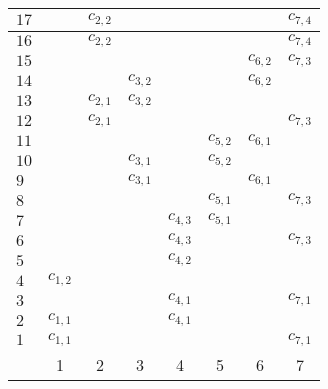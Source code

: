 \begin{center}
\begin{tabular}{l|c|c|c|c|c|c|c}
  \hline
  $17$ & & \cellcolor{Tan}$c_{2, 2}$  & & & & &  \cellcolor{light-gray}$c_{7, 4}$ \\
  \hline
  $16$ & & \cellcolor{light-gray}$c_{2, 2}$  & & & & & \cellcolor{Tan}$c_{7, 4}$  \\
  \hline
  $15$ & &   &   & & & \cellcolor{BurntOrange}$c_{6, 2}$  & \cellcolor{light-gray}$c_{7, 3}$  \\
  \hline
  $14$ & &   & \cellcolor{BurntOrange}$c_{3, 2}$  & & & \cellcolor{light-gray}$c_{6, 2}$  &   \\
  \hline
  $13$ & & \cellcolor{BurntOrange}$c_{2, 1}$  & \cellcolor{light-gray}$c_{3, 2}$  & & &   &   \\
  \hline
  $12$ & & \cellcolor{light-gray}$c_{2, 1}$  &   & & &   & \cellcolor{BurntOrange}$c_{7, 3}$  \\
  \hline
  $11$ & & &  & & \cellcolor{ForestGreen}$c_{5, 2}$  & \cellcolor{light-gray}$c_{6, 1}$ &\\
  \hline
  $10$ & & & \cellcolor{ForestGreen}$c_{3, 1}$  & & \cellcolor{light-gray}$c_{5, 2}$  &  &\\
  \hline
  $9$ & & & \cellcolor{light-gray}$c_{3, 1} $ & &   & \cellcolor{ForestGreen}$c_{6, 1}$ &\\
  \hline
  $8$ & & & & & \cellcolor{Fuchsia}$c_{5, 1}$ & & \cellcolor{light-gray}$c_{7, 3}$\\
  \hline
  $7$ & & & & \cellcolor{Fuchsia}$c_{4, 3}$ & \cellcolor{light-gray}$c_{5, 1}$ & & \\
  \hline
  $6$ & & & & \cellcolor{light-gray}$c_{4, 3}$ & & & \cellcolor{Fuchsia}$c_{7, 3}$\\
  \hline
  $5$ & \cellcolor{NavyBlue}{\color{white} $c_{1, 2}$} & & & \cellcolor{light-gray}$c_{4, 2}$ & & & \\
  \hline
  $4$ & \cellcolor{light-gray}$c_{1, 2}$ & & & \cellcolor{NavyBlue}{\color{white}$c_{4, 2}$} & & & \\
  \hline
  $3$ & & & & \cellcolor{BrickRed}$c_{4, 1}$ & & & \cellcolor{light-gray}$c_{7, 1}$\\
  \hline
  $2$ & \cellcolor{BrickRed}$c_{1, 1}$ & & & \cellcolor{light-gray}$c_{4, 1}$ & & &  \\
  \hline
  $1$ & \cellcolor{light-gray}$c_{1, 1}$ & & & & & &  \cellcolor{BrickRed}$c_{7, 1}$\\
  \hline
  & 1 & 2 & 3 & 4 & 5 & 6 & 7
\end{tabular}
\end{center}


